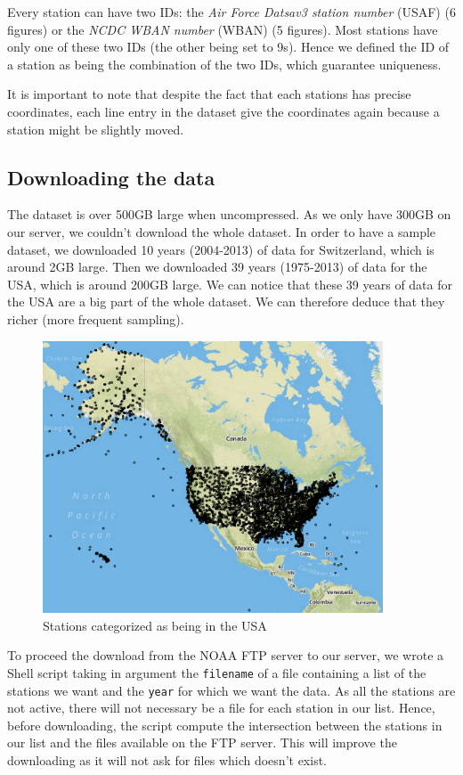 Every station can have two IDs: the \emph{Air Force Datsav3 station number} (USAF) (6 figures) or the \emph{NCDC WBAN number} (WBAN) (5 figures). Most stations have only one of these two IDs (the other being set to 9s). Hence we defined the ID of a station as being the combination of the two IDs, which guarantee uniqueness.

It is important to note that despite the fact that each stations has precise coordinates, each line entry in the dataset give the coordinates again because a station might be slightly moved.

\subsection{Downloading the data}
The dataset is over 500GB large when uncompressed. As we only have 300GB on our server, we couldn't download the whole dataset. In order to have a sample dataset, we downloaded 10 years (2004-2013) of data for Switzerland, which is around 2GB large. Then we downloaded 39 years (1975-2013) of data for the USA, which is around 200GB large. We can notice that these 39 years of data for the USA are a big part of the whole dataset. We can therefore deduce that they richer (more frequent sampling).

\begin{figure}[htb]
	\centering
	\includegraphics[width=0.9\textwidth]{figures/USStations.png}
	\caption{Stations categorized as being in the USA}
\end{figure}

To proceed the download from the NOAA FTP server to our server, we wrote a Shell script taking in argument the \texttt{filename} of a file containing a list of the stations we want and the \texttt{year} for which we want the data. As all the stations are not active, there will not necessary be a file for each station in our list. Hence, before downloading, the script compute the intersection between the stations in our list and the files available on the FTP server. This will improve the downloading as it will not ask for files which doesn't exist.